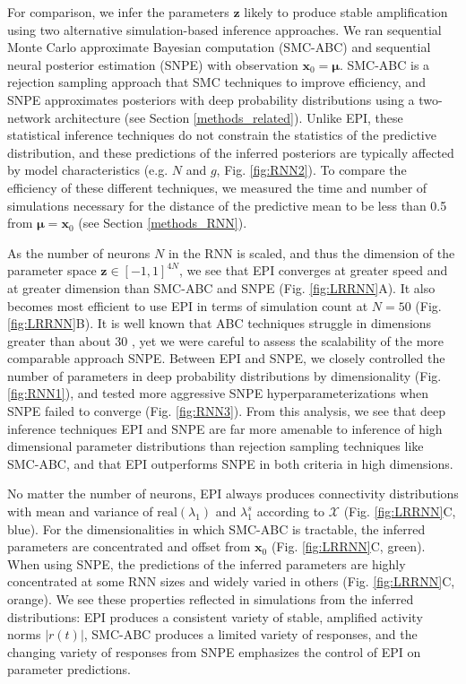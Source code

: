 \documentclass[11pt]{article}
\begin{document}
For comparison, we infer the parameters $\mathbf{z}$ likely to produce stable amplification using two alternative simulation-based inference approaches.
We ran sequential Monte Carlo approximate Bayesian computation (SMC-ABC) \cite{sisson2007sequential} and sequential neural posterior estimation (SNPE) \cite{gonccalves2019training} with observation $\mathbf{x}_0 = \bm{\mu}$.
SMC-ABC is a rejection sampling approach that SMC techniques to improve efficiency, and SNPE approximates posteriors with deep probability distributions using a two-network architecture (see Section \ref{methods_related}).
Unlike EPI, these statistical inference techniques do not constrain the statistics of the predictive distribution, and these predictions of the inferred posteriors are typically affected by model characteristics (e.g. $N$ and $g$, Fig. \ref{fig:RNN2}).
To compare the efficiency of these different techniques, we measured the time and number of simulations necessary for the distance of the predictive mean to be less than 0.5 from $\bm{\mu} = \mathbf{x}_0$ (see Section \ref{methods_RNN}).

As the number of neurons $N$ in the RNN is scaled, and thus the dimension of the parameter space $\mathbf{z} \in [-1, 1]^{4N}$, we see that EPI converges at greater speed and at greater dimension than SMC-ABC and SNPE (Fig. \ref{fig:LRRNN}A).
It also becomes most efficient to use EPI in terms of simulation count at $N=50$ (Fig. \ref{fig:LRRNN}B).
It is well known that ABC techniques struggle in dimensions greater than about 30 \cite{sisson2018handbook}, yet we were careful to assess the scalability of the more comparable approach SNPE.
Between EPI and SNPE, we closely controlled the number of parameters in deep probability distributions by dimensionality (Fig. \ref{fig:RNN1}), and tested more aggressive SNPE hyperparameterizations when SNPE failed to converge (Fig. \ref{fig:RNN3}).
From this analysis, we see that deep inference techniques EPI and SNPE are far more amenable to inference of high dimensional parameter distributions than rejection sampling techniques like SMC-ABC, and that EPI outperforms SNPE in both criteria in high dimensions.

No matter the number of neurons, EPI always produces connectivity distributions with mean and variance of $\text{real}(\lambda_1)$ and $\lambda_1^s$ according to $\mathcal{X}$ (Fig. \ref{fig:LRRNN}C, blue).
For the dimensionalities in which SMC-ABC is tractable, the inferred parameters are concentrated and offset from $\mathbf{x}_0$ (Fig. \ref{fig:LRRNN}C, green).
When using SNPE, the predictions of the inferred parameters are highly concentrated at some RNN sizes and widely varied in others (Fig. \ref{fig:LRRNN}C, orange).
We see these properties reflected in simulations from the inferred distributions: EPI produces a consistent variety of stable, amplified activity norms $|r(t)|$, SMC-ABC produces a limited variety of responses, and the changing variety of responses from SNPE emphasizes the control of EPI on parameter predictions.
\end{document}
